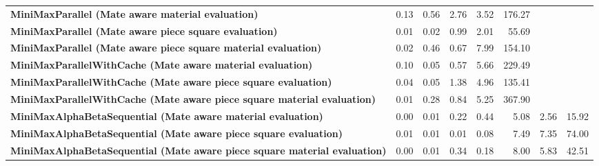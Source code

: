 \begin{table}[H]
{\begin{tabular}{|p{8cm}|*{7}{r|}}
            \rowcolor[HTML]{FFFFFF}
            \textbf{MiniMaxParallel (Mate aware material evaluation)}                                  & 0.13                                  & 0.56                                  & 2.76                                  & 3.52                                  & 176.27 &  &  \\
            \rowcolor[HTML]{EFEFEF}
            \textbf{MiniMaxParallel (Mate aware piece square evaluation)}                              & 0.01                                  & 0.02                                  & 0.99                                  & 2.01 & 55.69 &  &  \\
            \rowcolor[HTML]{FFFFFF}
            \textbf{MiniMaxParallel (Mate aware piece square material evaluation)}                     & 0.02                                  & 0.46 & 0.67 & 7.99 & 154.10 &  &  \\

            \rowcolor[HTML]{EFEFEF}
            \textbf{MiniMaxParallelWithCache (Mate aware material evaluation)}                         & 0.10                                  & 0.05                                  & 0.57 & 5.66 & 229.49 &  &  \\
            \rowcolor[HTML]{FFFFFF}
            \textbf{MiniMaxParallelWithCache (Mate aware piece square evaluation)}                     & 0.04                                  & 0.05 & 1.38 & 4.96 & 135.41 &  &  \\
            \rowcolor[HTML]{EFEFEF}
            \textbf{MiniMaxParallelWithCache (Mate aware piece square material evaluation)}            & 0.01 & 0.28 & 0.84 & 5.25 & 367.90 &  &  \\

            \rowcolor[HTML]{FFFFFF}
            \textbf{MiniMaxAlphaBetaSequential (Mate aware material evaluation)}                       & 0.00                                  & 0.01                                  & 0.22 & 0.44 & 5.08 & 2.56 & 15.92 \\
            \rowcolor[HTML]{EFEFEF}
            \textbf{MiniMaxAlphaBetaSequential (Mate aware piece square evaluation)}                   & 0.01                                  & 0.01 & 0.01 & 0.08 & 7.49 & 7.35 & 74.00 \\
            \rowcolor[HTML]{FFFFFF}
            \textbf{MiniMaxAlphaBetaSequential (Mate aware piece square material evaluation)}               & 0.00 & 0.01 & 0.34 & 0.18 & 8.00 & 5.83 & 42.51 \\


\end{tabular}}
\end{table}
